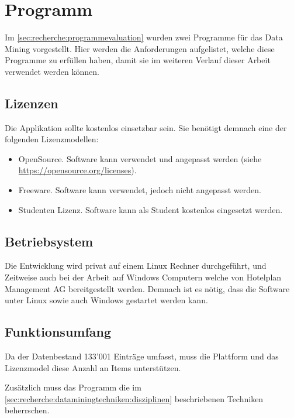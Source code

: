 \section{Programm}
\label{sec:anforderungsanalyse:programm}
Im \cref{sec:recherche:programmevaluation} wurden zwei Programme für das Data Mining vorgestellt. Hier werden die Anforderungen aufgelistet, welche diese Programme zu erfüllen haben, damit sie im weiteren Verlauf dieser Arbeit verwendet werden können.

\subsection{Lizenzen}
\label{sec:anforderungsanalyse:programm:lizenzen}
Die Applikation sollte kostenlos einsetzbar sein. Sie benötigt demnach eine der folgenden Lizenzmodellen:
\begin{itemize}
\item OpenSource. Software kann verwendet und angepasst werden (siehe \url{https://opensource.org/licenses}).
\item Freeware. Software kann verwendet, jedoch nicht angepasst werden.
\item Studenten Lizenz. Software kann als Student kostenlos eingesetzt werden.
\end{itemize}

\subsection{Betriebsystem}
\label{sec:anforderungsanalyse:programm:betriebsystem}
Die Entwicklung wird privat auf einem Linux Rechner durchgeführt, und Zeitweise auch bei der Arbeit auf Windows Computern welche von Hotelplan Management AG bereitgestellt werden.
Demnach ist es nötig, dass die Software unter Linux sowie auch Windows gestartet werden kann.

\subsection{Funktionsumfang}
\label{sec:anforderungsanalyse:programm:funktionsumfang}
Da der Datenbestand 133'001 Einträge umfasst, muss die Plattform und das Lizenzmodel diese Anzahl an Items unterstützen.

Zusätzlich muss das Programm die im \cref{sec:recherche:dataminingtechniken:disziplinen} beschriebenen Techniken beherrschen.

